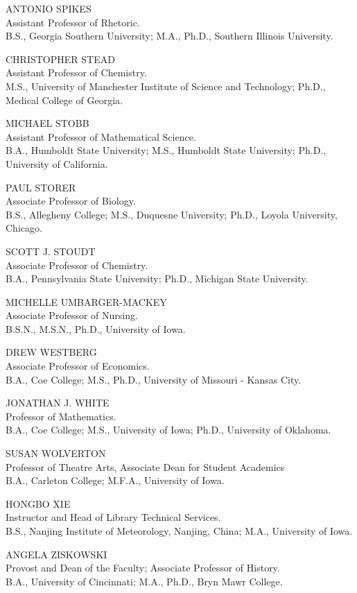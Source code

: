 \documentclass[
  letterpaper,
]{scrbook}
\begin{document}
ANTONIO SPIKES\\
Assistant Professor of Rhetoric.\\
B.S., Georgia Southern University; M.A., Ph.D., Southern Illinois
University.

CHRISTOPHER STEAD\\
Assistant Professor of Chemistry.\\
M.S., University of Manchester Institute of Science and Technology;
Ph.D., Medical College of Georgia.

MICHAEL STOBB\\
Assistant Professor of Mathematical Science.\\
B.A., Humboldt State University; M.S., Humboldt State University; Ph.D.,
University of California.

PAUL STORER\\
Associate Professor of Biology.\\
B.S., Allegheny College; M.S., Duquesne University; Ph.D., Loyola
University, Chicago.

SCOTT J. STOUDT\\
Associate Professor of Chemistry.\\
B.A., Pennsylvania State University; Ph.D., Michigan State University.

MICHELLE UMBARGER-MACKEY\\
Associate Professor of Nursing.\\
B.S.N., M.S.N., Ph.D., University of Iowa.

DREW WESTBERG\\
Associate Professor of Economics.\\
B.A., Coe College; M.S., Ph.D., University of Missouri - Kansas City.

JONATHAN J. WHITE\\
Professor of Mathematics.\\
B.A., Coe College; M.S., University of Iowa; Ph.D., University of
Oklahoma.

SUSAN WOLVERTON\\
Professor of Theatre Arts, Associate Dean for Student Academics\\
B.A., Carleton College; M.F.A., University of Iowa.

HONGBO XIE\\
Instructor and Head of Library Technical Services.\\
B.S., Nanjing Institute of Meteorology, Nanjing, China; M.A., University
of Iowa.

ANGELA ZISKOWSKI\\
Provost and Dean of the Faculty; Associate Professor of History.\\
B.A., University of Cincinnati; M.A., Ph.D., Bryn Mawr College.
\end{document}
